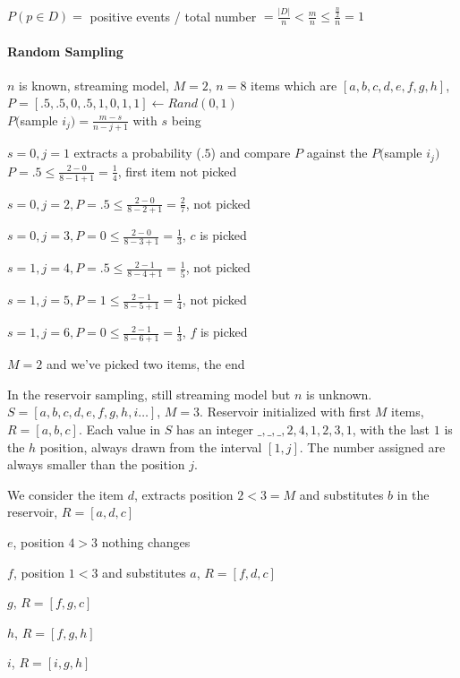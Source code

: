 \documentclass[10pt]{report}
\begin{document}
\paragraph{} %
$P(p\in D) = $ positive events / total number $= \frac{|D|}{n} < \frac{m}{n} \leq \frac{\frac{n}{2}}{n} = 1$\\

\paragraph{Random Sampling}
$n$ is known, streaming model, $M = 2$, $n = 8$ items which are $[a, b, c, d, e, f, g, h]$, $P = [.5, .5, 0, .5, 1, 0, 1, 1] \leftarrow Rand(0,1)$\\
$P($sample $i_j) = \frac{m - s}{n - j + 1}$ with $s$ being\\ %
\begin{list}{}{}
	\item $s = 0, j = 1$ extracts a probability ($.5$) and compare $P$ against the $P($sample $i_j)$\\
	$P = .5 \leq \frac{2 - 0}{8 - 1 + 1} = \frac{1}{4}$, first item not picked
	\item $s = 0, j = 2, P = .5 \leq \frac{2 - 0}{8 - 2 + 1} = \frac{2}{7}$, not picked
	\item $s = 0, j = 3, P = 0 \leq \frac{2 - 0}{8 - 3 + 1} = \frac{1}{3}$, $c$ is picked
	\item $s = 1, j = 4, P = .5 \leq \frac{2 - 1}{8 - 4 + 1} = \frac{1}{5}$, not picked
	\item $s = 1, j = 5, P = 1 \leq \frac{2 - 1}{8 - 5 + 1} = \frac{1}{4}$, not picked
	\item $s = 1, j = 6, P = 0 \leq \frac{2 - 1}{8 - 6 + 1} = \frac{1}{3}$, $f$ is picked
	\item $M = 2$ and we've picked two items, the end
\end{list}
In the reservoir sampling, still streaming model but $n$ is unknown. $S = [a, b, c, d, e, f, g, h, i\ldots]$, $M = 3$. Reservoir initialized with first $M$ items, $R = [a, b, c]$. Each value in $S$ has an integer $\_, \_, \_, 2, 4, 1, 2, 3, 1$, with the last $1$ is the $h$ position, always drawn from the interval $[1, j]$. The number assigned are always smaller than the position $j$.
\begin{list}{}{}
	\item We consider the item $d$, extracts position $2 < 3 = M$ and substitutes $b$ in the reservoir, $R = [a, d, c]$
	\item $e$, position $4 > 3$ nothing changes
	\item $f$, position $1 < 3$ and substitutes $a$, $R =  [f, d, c]$
	\item $g$, $R = [f, g, c]$
	\item $h$, $R = [f, g, h]$
	\item $i$, $R = [i, g, h]$
\end{list}
\end{document}
